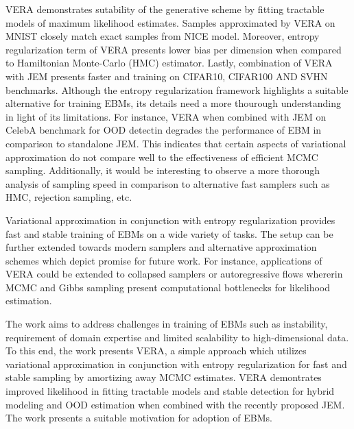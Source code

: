 \documentclass[11pt,letterpaper]{article}
\begin{document}
VERA demonstrates sutability of the generative scheme by fitting tractable models of maximum likelihood estimates. Samples approximated by VERA on MNIST closely match exact samples from NICE model. Moreover, entropy regularization term of VERA presents lower bias per dimension when compared to Hamiltonian Monte-Carlo (HMC) estimator. Lastly, combination of VERA with JEM presents faster and training on CIFAR10, CIFAR100 AND SVHN benchmarks. Although the entropy regularization framework highlights a suitable alternative for training EBMs, its details need a more thourough understanding in light of its limitations. For instance, VERA when combined with JEM on CelebA benchmark for OOD detectin degrades the performance of EBM in comparison to standalone JEM. This indicates that certain aspects of variational approximation do not compare well to the effectiveness of efficient MCMC sampling. Additionally, it would be interesting to observe a more thorough analysis of sampling speed in comparison to alternative fast samplers such as HMC, rejection sampling, etc. 

Variational approximation in conjunction with entropy regularization provides fast and stable training of EBMs on a wide variety of tasks. The setup can be further extended towards modern samplers and alternative approximation schemes which depict promise for future work. For instance, applications of VERA could be extended to collapsed samplers or autoregressive flows whererin MCMC and Gibbs sampling present computational bottlenecks for likelihood estimation. 

The work aims to address challenges in training of EBMs such as instability, requirement of domain expertise and limited scalability to high-dimensional data. To this end, the work presents VERA, a simple approach which utilizes variational approximation in conjunction with entropy regularization for fast and stable sampling by amortizing away MCMC estimates. VERA demontrates improved likelihood in fitting tractable models and stable detection for hybrid modeling and OOD estimation when combined with the recently proposed JEM. The work presents a suitable motivation for adoption of EBMs. 
\end{document}
